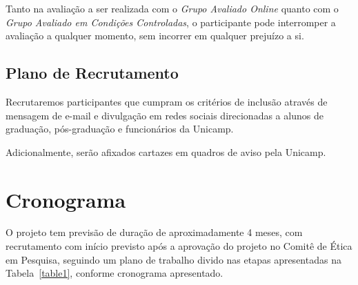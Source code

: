 \documentclass[a4paper,11pt,titlepage,singlespacing]{article}
\newcommand\todo[1]{\textcolor{red}{#1}}
\begin{document}

\noindent Tanto na avaliação a ser realizada com o \textit{Grupo Avaliado Online} quanto com o \textit{Grupo Avaliado em Condições Controladas}, o participante pode interromper a avaliação a qualquer momento, sem incorrer em qualquer prejuízo a si.



\subsection{Plano de Recrutamento}

\noindent Recrutaremos participantes que cumpram os critérios de inclusão através de mensagem de e-mail e divulgação em redes sociais direcionadas a alunos de graduação, pós-graduação e funcionários da Unicamp.

Adicionalmente, serão afixados cartazes em quadros de aviso pela Unicamp.

\section{Cronograma}
\noindent O projeto tem previsão de duração de aproximadamente 4 meses, com recrutamento com início previsto após a aprovação do projeto no Comitê de Ética em Pesquisa, seguindo um plano de trabalho divido nas etapas apresentadas na Tabela~\ref{table1}, conforme cronograma apresentado.
\end{document}
